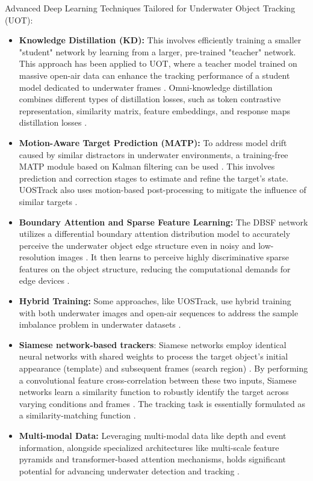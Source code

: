 Advanced Deep Learning Techniques Tailored for Underwater Object Tracking (UOT):
\begin{itemize}
    \item \textbf{Knowledge Distillation (KD):} This involves efficiently training a smaller "student" network by learning from a larger, pre-trained "teacher" network. This approach has been applied to UOT, where a teacher model trained on massive open-air data can enhance the tracking performance of a student model dedicated to underwater frames \cite{zhang2024webuot}. Omni-knowledge distillation combines different types of distillation losses, such as token contrastive representation, similarity matrix, feature embeddings, and response maps distillation losses \cite{zhang2024webuot}.
    \item \textbf{Motion-Aware Target Prediction (MATP):} To address model drift caused by similar distractors in underwater environments, a training-free MATP module based on Kalman filtering can be used \cite{zhang2024webuot}. This involves prediction and correction stages to estimate and refine the target's state. UOSTrack also uses motion-based post-processing to mitigate the influence of similar targets \cite{qiu2024boundary}\cite{zhang2024webuot}.
    \item \textbf{Boundary Attention and Sparse Feature Learning:} The DBSF network utilizes a differential boundary attention distribution model to accurately perceive the underwater object edge structure even in noisy and low-resolution images \cite{qiu2024boundary}. It then learns to perceive highly discriminative sparse features on the object structure, reducing the computational demands for edge devices \cite{qiu2024boundary}.
    \item \textbf{Hybrid Training:} Some approaches, like UOSTrack, use hybrid training with both underwater images and open-air sequences to address the sample imbalance problem in underwater datasets \cite{zhang2024webuot}.
    \item \textbf{Siamese network-based trackers}: Siamese networks employ identical neural networks with shared weights to process the target object's initial appearance (template) and subsequent frames (search region) \cite{elmezain2025advancing}. By performing a convolutional feature cross-correlation between these two inputs, Siamese networks learn a similarity function to robustly identify the target across varying conditions and frames \cite{elmezain2025advancing}\cite{zhao2020correlation}\cite{wu2023hybrid}. The tracking task is essentially formulated as a similarity-matching function \cite{wu2023hybrid}.
    \item \textbf{Multi-modal Data:} Leveraging multi-modal data like depth and event information, alongside specialized architectures like multi-scale feature pyramids and transformer-based attention mechanisms, holds significant potential for advancing underwater detection and tracking \cite{elmezain2025advancing}.
\end{itemize}


